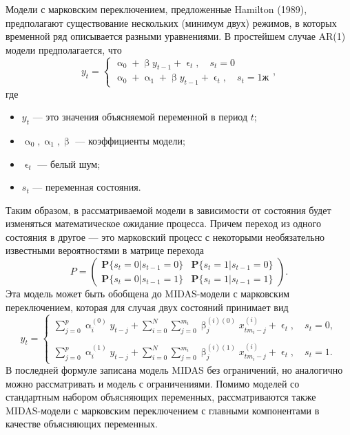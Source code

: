 \documentclass[a4paper, 12pt]{extarticle}
\numberwithin{equation}{subsection}
\renewcommand{\alpha}{\upalpha}
\renewcommand{\beta}{\upbeta}
\renewcommand{\epsilon}{\upvarepsilon}
\begin{document}
	Модели с марковским переключением, предложенные Hamilton (1989), предполагают существование нескольких (минимум двух) режимов, в которых временной ряд описывается разными уравнениями. В простейшем случае AR(1) модели предполагается, что
	\begin{equation}
		y_t = \begin{cases}
		\alpha_0 + \beta y_{t-1} + \epsilon_t,\quad s_t = 0\\
		\alpha_0 + \alpha_1 + \beta y_{t-1} + \epsilon_t, \quad s_t = 1ж
	\end{cases},
	\end{equation}
	где \begin{itemize}
		\item $y_t$ --- это значения объясняемой переменной в период $t$;
		\item $\alpha_0, \alpha_1, \beta$ --- коэффициенты модели;
		\item $\epsilon_t$ --- белый шум;
		\item $s_t$ --- переменная состояния.
	\end{itemize}
	Таким образом, в рассматриваемой модели в зависимости от состояния будет изменяться математическое ожидание процесса. Причем переход из одного состояния в другое --- это марковский процесс с некоторыми необязательно известными вероятностями в матрице перехода 
	\begin{equation}
		P = \begin{pmatrix}
		\mathbf{P}\{s_t = 0 | s_{t-1} = 0\} & \mathbf{P}\{s_t = 1 | s_{t-1} = 0\}\\
		\mathbf{P}\{s_t = 0 | s_{t-1} = 1\} & \mathbf{P}\{s_t = 1 | s_{t-1} = 1\}
	\end{pmatrix}.
	\end{equation}
	Эта модель может быть обобщена до MIDAS-модели с марковским переключением, которая для случая двух состояний принимает вид
	\begin{equation}
		y_t = \begin{cases}
		\sum_{j =0}^{p}\alpha^{(0)}_i y_{t-j} + \sum_{i = 0}^{N}\sum_{j=0}^{m_i} \beta_j^{(i)(0)} x^{(i)}_{tm_i-j} + \epsilon_t,\quad s_t = 0,\\\\
		\sum_{j =0}^{p}\alpha^{(1)}_i y_{t-j} + \sum_{i = 0}^{N}\sum_{j=0}^{m_i} \beta_j^{(i)(1)} x^{(i)}_{tm_i-j} + \epsilon_t,\quad s_t = 1.
	\end{cases}
	\end{equation}
	В последней формуле записана модель MIDAS без ограничений, но аналогично можно рассматривать и модель с ограничениями. Помимо моделей со стандартным набором объясняющих переменных, рассматриваются также MIDAS-модели с марковским переключением с главными компонентами в качестве объясняющих переменных.
\end{document}
